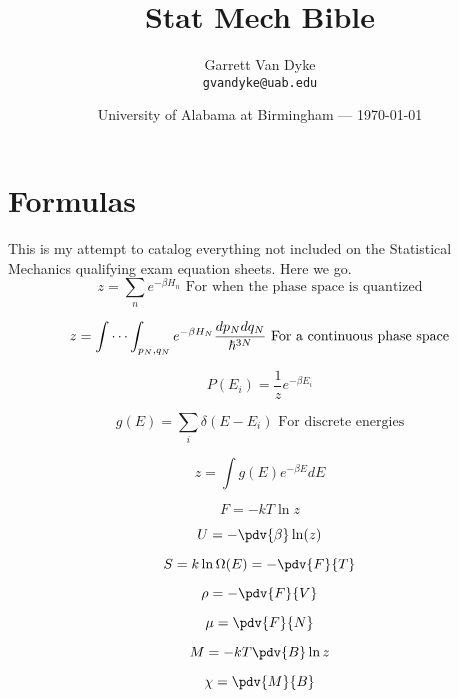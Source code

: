 \documentclass{article}
\title{Stat Mech Bible} %
\author{Garrett Van Dyke\\ \texttt{gvandyke@uab.edu}} %
\date{University of Alabama at Birmingham --- \today} %
\begin{document}
\maketitle %


\section*{Formulas} %

This is my attempt to catalog everything not included on the Statistical Mechanics qualifying exam equation sheets. Here we go.
\begin{equation}
	z=\sum_n e^{-\beta H_n} \text{    For when the phase space is quantized}
\end{equation}

\begin{equation}
	z=\idotsint_{p_N, q_N} e^{-\beta H_N} \frac{dp_N dq_N}{\hbar^{3N}} \text{   For a continuous phase space}
\end{equation}

\begin{equation}
	P(E_i)=\frac{1}{z}e^{-\beta E_i}
\end{equation}

\begin{equation}
	g(E)=\sum_i \delta(E-E_i) \text{   For discrete energies}
\end{equation}

\begin{equation}
	z=\int g(E)e^{-\beta E}dE
\end{equation}

\begin{equation}
	F=-kT\ln z
\end{equation}

\begin{equation}
	U=-\pdv{\beta}\ln(z)
\end{equation}

\begin{equation}
	S=k\ln\Omega(E)=-\pdv{F}{T}
\end{equation}

\begin{equation}
	\rho=-\pdv{F}{V}
\end{equation}

\begin{equation}
	\mu=\pdv{F}{N}
\end{equation}

\begin{equation}
	M=-kT\pdv{B}\ln z
\end{equation}

\begin{equation}
	\chi=\pdv{M}{B}
\end{equation}
\end{document}
